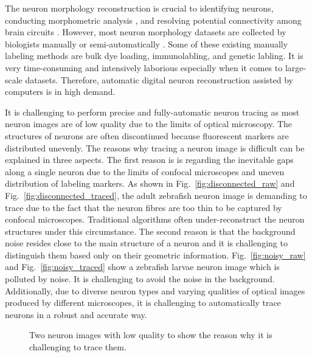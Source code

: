 \documentclass[conference]{IEEEtran}
\begin{document}
The neuron morphology reconstruction is crucial to identifying neurons\cite{background5}, conducting morphometric analysis \cite{background3}, and resolving potential connectivity among brain circuits \cite{background1}. However, most neuron morphology datasets are collected by biologists manually or semi-automatically \cite{background1}. Some of these existing manually labeling methods are bulk dye loading\cite{label1}, immunolabling\cite{label2}, and genetic labling\cite{genetic_label}.
It is very time-consuming and intensively laborious especially when it comes to large-scale datasets.  Therefore, automatic digital neuron reconstruction assisted by computers is in high demand.

It is challenging to perform precise and fully-automatic neuron tracing as most neuron images are of low quality due to the limits of optical microscopy. The structures of neurons are often discontinued because fluorescent markers are distributed unevenly. The reasons why tracing a neuron image is difficult can be explained in three aspects. The first reason is is regarding the inevitable gaps along a single neuron due to the limits of confocal microscopes and uneven distribution of labeling markers. As shown in Fig.~\ref{fig:disconnected_raw} and Fig.~\ref{fig:disconnected_traced}, the adult zebrafish neuron image is demanding to trace due to the fact that the neuron fibres are too thin to be captured by confocal microscopes. Traditional algorithms \cite{rayburst, snake} often under-reconstruct the neuron structures under this circumstance. The second reason is that the background noise resides close to the main structure of a neuron and it is challenging to distinguish them based only on their geometric information. Fig.~\ref{fig:noisy_raw} and Fig.~\ref{fig:noisy_traced} show a zebrafish larvae neuron image which is polluted by noise. It is challenging to avoid the noise in the background. Additionally, due to diverse neuron types and varying qualities of optical images produced by different microscopes, it is challenging to automatically trace neurons in a robust and accurate way.


\begin{figure}[!ht]
\centering
{
\caption{Two neuron images with low quality to show the reason why it is challenging to trace them.}
\label{fig:low_quality}
}
\end{figure}
\end{document}
